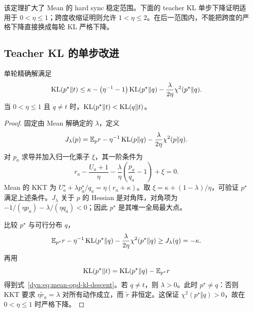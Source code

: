 该定理扩大了 Mean 的 hard sync 稳定范围。下面的 teacher KL 单步下降证明适用于 $0<\eta\le1$；跨度收缩证明则允许 $1<\eta\le2$。在后一范围内，不能把跨度的严格下降直接换成每轮 KL 严格下降。

\subsection{Teacher KL 的单步改进}

\begin{proposition}
\label{dyn:prop:mean-opd-kl-descent}
单轮精确解满足
\begin{equation}
 \operatorname{KL}(p^\star\Vert t)
 \le\kappa-\left(\eta^{-1}-1\right)\operatorname{KL}(p^\star\Vert q)
       -\frac{\lambda}{2\eta}\chi^2(p^\star\Vert q).
 \label{dyn:eq:mean-opd-kl-descent}
\end{equation}
当 $0<\eta\le1$ 且 $q\ne t$ 时，$\operatorname{KL}(p^\star\Vert t)<\operatorname{KL}(q\Vert t)$。
\end{proposition}

\begin{proof}
固定由 Mean 解确定的 $\lambda$，定义
\begin{equation*}
 J_\lambda(p)=\mathbb E_pr-\eta^{-1}\operatorname{KL}(p\Vert q)
                    -\frac{\lambda}{2\eta}\chi^2(p\Vert q).
\end{equation*}
对 $p_a$ 求导并加入归一化乘子 $\xi$，其一阶条件为
\begin{equation*}
 r_a-\frac{U_a+1}{\eta}
 -\frac{\lambda}{\eta}\left(\frac{p_a}{q_a}-1\right)+\xi=0.
\end{equation*}
Mean 的 KKT 为 $U_a^\star+\lambda p_a^\star/q_a=\eta(r_a+\kappa)$。取 $\xi=\kappa+(1-\lambda)/\eta$，可验证 $p^\star$ 满足上述条件。$J_\lambda$ 关于 $p$ 的 Hessian 是对角阵，对角项为 $-1/(\eta p_a)-\lambda/(\eta q_a)<0$；因此 $p^\star$ 是其唯一全局最大点。

比较 $p^\star$ 与可行分布 $q$，
\begin{equation*}
 \mathbb E_{p^\star}r-\eta^{-1}\operatorname{KL}(p^\star\Vert q)
 -\frac{\lambda}{2\eta}\chi^2(p^\star\Vert q)
 \ge J_\lambda(q)=-\kappa.
\end{equation*}
再用
\begin{equation*}
 \operatorname{KL}(p^\star\Vert t)=\operatorname{KL}(p^\star\Vert q)-\mathbb E_{p^\star}r
\end{equation*}
得到式~\eqref{dyn:eq:mean-opd-kl-descent}。若 $q\ne t$，则 $\lambda>0$。此时 $p^\star\ne q$：否则 KKT 要求 $\eta \widetilde r_a=\lambda$ 对所有动作成立，而  $\widetilde r$ 非恒定。这保证 $\chi^2(p^\star\Vert q)>0$，故在 $0<\eta\le1$ 时严格下降。
\end{proof}

